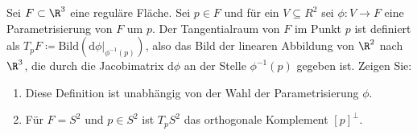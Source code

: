 \newpage
\begin{assignment}
  Sei \( F \subset \R^3 \) eine reguläre Fläche. Sei \( p \in F \) und für ein \( V \subseteq R^2 \) sei \( \phi: V \to F \) eine Parametrisierung von \( F \) um \( p \). Der Tangentialraum von \( F \) im Punkt \( p \) ist definiert als \( T_p F \coloneqq \text{Bild}(\text{d}\phi|_{\phi^{-1}(p)}) \), also das Bild der linearen Abbildung von \( \R^2 \) nach \( \R^3 \), die durch die Jacobimatrix \( \text{d}\phi \) an der Stelle \( \phi^{-1}(p) \) gegeben ist. Zeigen Sie:
  \begin{enumerate}[label= (\alph*)]
    \item Diese Definition ist unabhängig von der Wahl der Parametrisierung \( \phi \).
    \item Für \( F = S^2 \) und \( p \in S^2 \) ist \( T_p S^2 \) das orthogonale Komplement \( {[p]}^\perp \).
  \end{enumerate}
\end{assignment}
